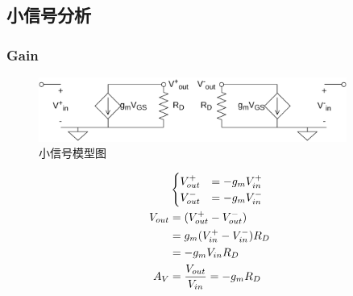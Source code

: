 \documentclass[twoside,a4paper,openright,titlepage,draft]{ctexrep}
\begin{document}
\subsection{小信号分析}
\subsubsection{Gain}
\begin{figure}[H]
    \centering
    \includegraphics[width=0.9\textwidth]{smallsignaldiff.drawio.pdf}
    \caption{小信号模型图}
    \label{fig:smallsignal}
\end{figure}
\begin{align}
    &\begin{cases}
        V_{out}^+ &= -g_mV_{in}^+ \\
        V_{out}^- &= -g_mV_{in}^-
    \end{cases} \\
    V_{out} &= (V_{out}^+ - V_{out}^-)\notag\\
    &= g_m(V_{in}^+ - V_{in}^-)R_D\notag\\
    &= -g_mV_{in}R_D \\
    A_V &= \frac{V_{out}}{V_{in}} = -g_mR_D
\end{align}
\end{document}
